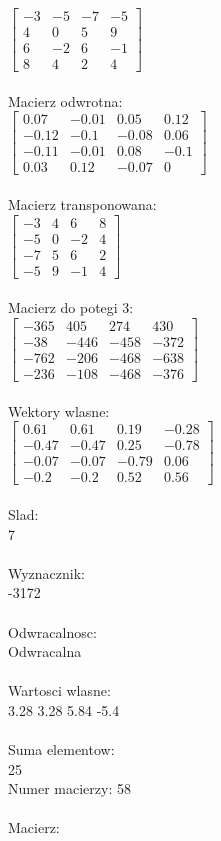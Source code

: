 \documentclass[a4paper,12pt]{article}
\begin{document}
$\begin{bmatrix} -3&-5&-7&-5\\4&0&5&9\\6&-2&6&-1\\8&4&2&4 \end{bmatrix}$
\\
\\
Macierz odwrotna:\\

$\begin{bmatrix} 0.07&-0.01&0.05&0.12\\-0.12&-0.1&-0.08&0.06\\-0.11&-0.01&0.08&-0.1\\0.03&0.12&-0.07&0 \end{bmatrix}$
\\
\\
Macierz transponowana:\\

$\begin{bmatrix} -3&4&6&8\\-5&0&-2&4\\-7&5&6&2\\-5&9&-1&4 \end{bmatrix}$
\\
\\
Macierz do potegi 3:\\

$\begin{bmatrix} -365&405&274&430\\-38&-446&-458&-372\\-762&-206&-468&-638\\-236&-108&-468&-376 \end{bmatrix}$
\\
\\
Wektory wlasne:\\

$\begin{bmatrix} 0.61&0.61&0.19&-0.28\\-0.47&-0.47&0.25&-0.78\\-0.07&-0.07&-0.79&0.06\\-0.2&-0.2&0.52&0.56 \end{bmatrix}$
\\
\\
Slad:\\
7
\\
\\
Wyznacznik:\\
-3172
\\
\\
Odwracalnosc:\\
Odwracalna
\\
\\
Wartosci wlasne:\\
3.28 3.28 5.84 -5.4
\\
\\
Suma elementow:\\
25
\\
\newpage
Numer macierzy:
58
\\
\\
Macierz:\\
\end{document}

